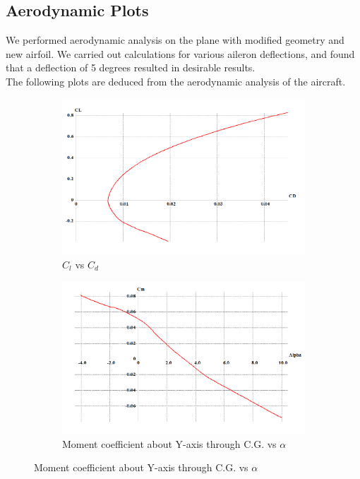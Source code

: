 \subsection{Aerodynamic Plots}
We performed aerodynamic analysis on the plane with modified geometry and new airfoil. We carried out calculations for various aileron deflections, and found that a deflection of 5 degrees resulted in desirable results.\\
The following plots are deduced from the aerodynamic analysis of the aircraft.
\begin{figure}[H]
\begin{subfigure}{0.6\textwidth}
\includegraphics[width = \linewidth]{cl_vs_cd__1_.png}
\caption{$C_l$ vs $C_d$}
\end{subfigure}
\begin{subfigure}{0.6\textwidth}
\includegraphics[width = \linewidth]{cm_alpha__1_.png}
\caption{Moment coefficient about Y-axis through C.G. vs $\alpha$}
\end{subfigure}

\end{figure}
